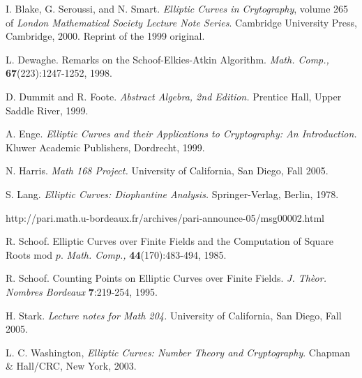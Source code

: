 \documentclass{article}
\begin{document}








\begin{thebibliography}{99}

 I. Blake, G. Seroussi, and N. Smart.  \emph{Elliptic Curves in Crytography}, volume 265 of 
\emph{London Mathematical Society Lecture Note Series}.  Cambridge University Press, Cambridge, 2000.  Reprint of the 1999 original.

 L. Dewaghe.  Remarks on the Schoof-Elkies-Atkin Algorithm. \emph{Math. Comp.,} 
{\bf 67}(223):1247-1252, 1998.

  D. Dummit and R. Foote.  \emph{Abstract Algebra, 2nd Edition.}  Prentice Hall, Upper Saddle River, 1999.

 A. Enge. \emph{Elliptic Curves and their Applications to Cryptography: An Introduction.}  
Kluwer Academic Publishers, Dordrecht, 1999.

 N. Harris.  \emph{Math 168 Project.} University of California, San Diego, Fall 2005.

 S. Lang. \emph{Elliptic Curves: Diophantine Analysis.} Springer-Verlag, Berlin, 1978.

http://pari.math.u-bordeaux.fr/archives/pari-announce-05/msg00002.html

 R. Schoof.  Elliptic Curves over Finite Fields and the Computation of Square Roots mod $p$. \emph{Math. Comp.,} 
{\bf 44}(170):483-494, 1985.

 R. Schoof.  Counting Points on Elliptic Curves over Finite Fields. \emph{J. Th\`eor. Nombres Bordeaux} {\bf 7}:219-254, 1995.

 H. Stark. \emph{Lecture notes for Math 204.} University of California, San Diego, Fall 2005.

 L. C. Washington, \emph{Elliptic Curves: Number Theory and Cryptography}.  Chapman \& Hall/CRC, New York, 2003.

\end{thebibliography}
\end{document}
